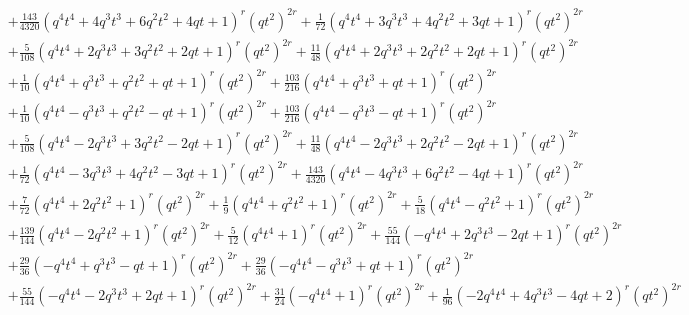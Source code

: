 \documentclass[11pt,english]{amsart}
\numberwithin{equation}{section}
\numberwithin{figure}{section}
\theoremstyle{plain}
\theoremstyle{plain}
\theoremstyle{definition}
\theoremstyle{remark}
\begin{document}
{\begin{align*}
& + \frac{143}{4320}  {\left(q^{4} t^{4} + 4  q^{3} t^{3} + 6  q^{2} t^{2} + 4  q t + 1\right)}^{r} \left(q t^{2}\right)^{2  r} + \frac{1}{72}  {\left(q^{4} t^{4} + 3  q^{3} t^{3} + 4  q^{2} t^{2} + 3  q t + 1\right)}^{r} \left(q t^{2}\right)^{2  r} \\
& + \frac{5}{108}  {\left(q^{4} t^{4} + 2  q^{3} t^{3} + 3  q^{2} t^{2} + 2  q t + 1\right)}^{r} \left(q t^{2}\right)^{2  r} + \frac{11}{48}  {\left(q^{4} t^{4} + 2  q^{3} t^{3} + 2  q^{2} t^{2} + 2  q t + 1\right)}^{r} \left(q t^{2}\right)^{2  r} \\
& + \frac{1}{10}  {\left(q^{4} t^{4} + q^{3} t^{3} + q^{2} t^{2} + q t + 1\right)}^{r} \left(q t^{2}\right)^{2  r} + \frac{103}{216}  {\left(q^{4} t^{4} + q^{3} t^{3} + q t + 1\right)}^{r} \left(q t^{2}\right)^{2  r} \\
& + \frac{1}{10}  {\left(q^{4} t^{4} - q^{3} t^{3} + q^{2} t^{2} - q t + 1\right)}^{r} \left(q t^{2}\right)^{2  r} + \frac{103}{216}  {\left(q^{4} t^{4} - q^{3} t^{3} - q t + 1\right)}^{r} \left(q t^{2}\right)^{2  r} \\
& + \frac{5}{108}  {\left(q^{4} t^{4} - 2  q^{3} t^{3} + 3  q^{2} t^{2} - 2  q t + 1\right)}^{r} \left(q t^{2}\right)^{2  r} + \frac{11}{48}  {\left(q^{4} t^{4} - 2  q^{3} t^{3} + 2  q^{2} t^{2} - 2  q t + 1\right)}^{r} \left(q t^{2}\right)^{2  r} \\
& + \frac{1}{72}  {\left(q^{4} t^{4} - 3  q^{3} t^{3} + 4  q^{2} t^{2} - 3  q t + 1\right)}^{r} \left(q t^{2}\right)^{2  r} + \frac{143}{4320}  {\left(q^{4} t^{4} - 4  q^{3} t^{3} + 6  q^{2} t^{2} - 4  q t + 1\right)}^{r} \left(q t^{2}\right)^{2  r} \\
& + \frac{7}{72}  {\left(q^{4} t^{4} + 2  q^{2} t^{2} + 1\right)}^{r} \left(q t^{2}\right)^{2  r} + \frac{1}{9}  {\left(q^{4} t^{4} + q^{2} t^{2} + 1\right)}^{r} \left(q t^{2}\right)^{2  r} + \frac{5}{18}  {\left(q^{4} t^{4} - q^{2} t^{2} + 1\right)}^{r} \left(q t^{2}\right)^{2  r} \\
& + \frac{139}{144}  {\left(q^{4} t^{4} - 2  q^{2} t^{2} + 1\right)}^{r} \left(q t^{2}\right)^{2  r} + \frac{5}{12}  {\left(q^{4} t^{4} + 1\right)}^{r} \left(q t^{2}\right)^{2  r} + \frac{55}{144}  {\left(-q^{4} t^{4} + 2  q^{3} t^{3} - 2  q t + 1\right)}^{r} \left(q t^{2}\right)^{2  r} \\
& + \frac{29}{36}  {\left(-q^{4} t^{4} + q^{3} t^{3} - q t + 1\right)}^{r} \left(q t^{2}\right)^{2  r} + \frac{29}{36}  {\left(-q^{4} t^{4} - q^{3} t^{3} + q t + 1\right)}^{r} \left(q t^{2}\right)^{2  r} \\
& + \frac{55}{144}  {\left(-q^{4} t^{4} - 2  q^{3} t^{3} + 2  q t + 1\right)}^{r} \left(q t^{2}\right)^{2  r} + \frac{31}{24}  {\left(-q^{4} t^{4} + 1\right)}^{r} \left(q t^{2}\right)^{2  r} + \frac{1}{96}  {\left(-2  q^{4} t^{4} + 4  q^{3} t^{3} - 4  q t + 2\right)}^{r} \left(q t^{2}\right)^{2  r} \\

\end{align*}}
\end{document}
